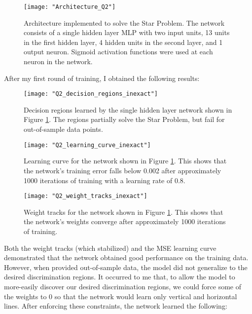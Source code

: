 \documentclass{article}[12 pt]
\begin{document}
\begin{center}
	\begin{figure}[H]
		\centering
		\texttt{[image: "Architecture\_Q2"]}
		\caption{Architecture implemented to solve the Star Problem.  The network consists of a single hidden layer MLP with two input units, 13 units in the first hidden layer, 4 hidden units in the second layer, and 1 output neuron. Sigmoid activation functions were used at each neuron in the network. }
		\label{fig:architectureQ2}
	\end{figure}
\end{center}

\noindent
After my first round of training, I obtained the following results:
\begin{center}
	\begin{figure}[H]
		\centering
		\texttt{[image: "Q2\_decision\_regions\_inexact"]}
		\caption{Decision regions learned by the single hidden layer network shown in Figure \ref{fig:architectureQ2}.  The regions partially solve the Star Problem, but fail for out-of-sample data points. }
		\label{fig:Q2RegionsInexact}
	\end{figure}
\end{center}

\begin{center}
	\begin{figure}[H]
		\centering
		\texttt{[image: "Q2\_learning\_curve\_inexact"]}
		\caption{Learning curve for the network shown in Figure \ref{fig:architectureQ2}.  This shows that the network's training error falls below 0.002 after approximately 1000 iterations of training with a learning rate of 0.8.}
		\label{fig:Q2RegionsInexact}
	\end{figure}
\end{center}

\begin{center}
	\begin{figure}[H]
		\centering
		\texttt{[image: "Q2\_weight\_tracks\_inexact"]}
		\caption{Weight tracks for the network shown in Figure \ref{fig:architectureQ2}.  This shows that the network's weights converge after approximately 1000 iterations of training.}
		\label{fig:Q2RegionsInexact}
	\end{figure}
\end{center}



\noindent
Both the weight tracks (which stabilized) and the MSE learning curve demonstrated that the network obtained good performance on the training data.  However, when provided out-of-sample data, the model did not generalize to the desired discrimination regions.  It occurred to me that, to allow the model to more-easily discover our desired discrimination regions, we could force some of the weights to 0 so that the network would learn only vertical and horizontal lines.  After enforcing these constraints, the network learned the following:
\end{document}
